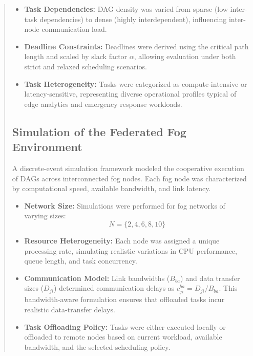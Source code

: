 \documentclass[conference]{IEEEtran}
\begin{document}
\begin{abstract}
\begin{itemize}
    \item \textbf{Task Dependencies:}  
    DAG density was varied from sparse (low inter-task dependencies) to dense (highly interdependent), influencing inter-node communication load.

    \item \textbf{Deadline Constraints:}  
    Deadlines were derived using the critical path length and scaled by slack factor $\alpha$, allowing evaluation under both strict and relaxed scheduling scenarios.

    \item \textbf{Task Heterogeneity:}  
    Tasks were categorized as compute-intensive or latency-sensitive, representing diverse operational profiles typical of edge analytics and emergency response workloads.
\end{itemize}

\subsection{Simulation of the Federated Fog Environment}

A discrete-event simulation framework modeled the cooperative execution of DAGs across interconnected fog nodes. Each fog node was characterized by computational speed, available bandwidth, and link latency. 

\begin{itemize}
    \item \textbf{Network Size:}  
    Simulations were performed for fog networks of varying sizes:
    \[
    N = \{2, 4, 6, 8, 10\}
    \]

    \item \textbf{Resource Heterogeneity:}  
    Each node was assigned a unique processing rate, simulating realistic variations in CPU performance, queue length, and task concurrency.

    \item \textbf{Communication Model:}  
    Link bandwidths ($B_{ba}$) and data transfer sizes ($D_{ji}$) determined communication delays as $c_{ji}^{ba} = D_{ji}/B_{ba}$.  
    This bandwidth-aware formulation ensures that offloaded tasks incur realistic data-transfer delays.

    \item \textbf{Task Offloading Policy:}  
    Tasks were either executed locally or offloaded to remote nodes based on current workload, available bandwidth, and the selected scheduling policy.
\end{itemize}


\end{abstract}
\end{document}
